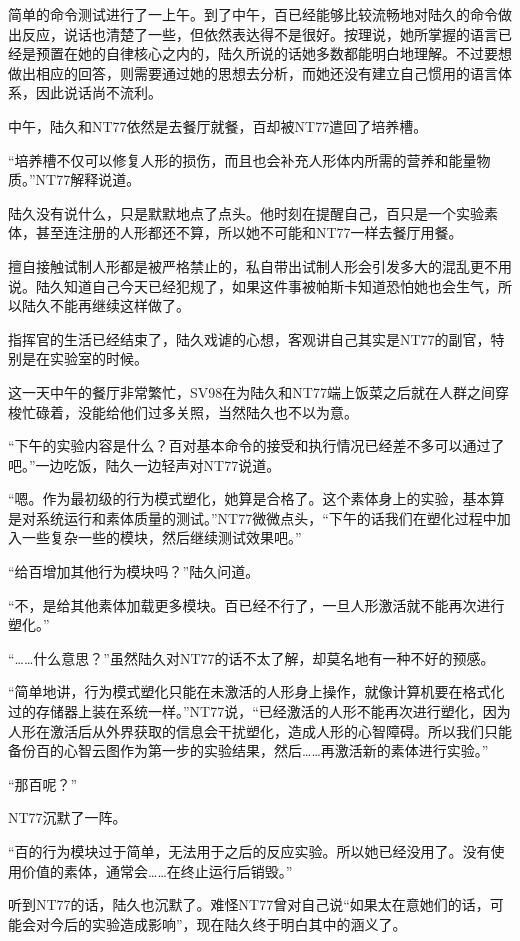简单的命令测试进行了一上午。到了中午，百已经能够比较流畅地对陆久的命令做出反应，说话也清楚了一些，但依然表达得不是很好。按理说，她所掌握的语言已经是预置在她的自律核心之内的，陆久所说的话她多数都能明白地理解。不过要想做出相应的回答，则需要通过她的思想去分析，而她还没有建立自己惯用的语言体系，因此说话尚不流利。

中午，陆久和NT77依然是去餐厅就餐，百却被NT77遣回了培养槽。

“培养槽不仅可以修复人形的损伤，而且也会补充人形体内所需的营养和能量物质。”NT77解释说道。

陆久没有说什么，只是默默地点了点头。他时刻在提醒自己，百只是一个实验素体，甚至连注册的人形都还不算，所以她不可能和NT77一样去餐厅用餐。

擅自接触试制人形都是被严格禁止的，私自带出试制人形会引发多大的混乱更不用说。陆久知道自己今天已经犯规了，如果这件事被帕斯卡知道恐怕她也会生气，所以陆久不能再继续这样做了。

指挥官的生活已经结束了，陆久戏谑的心想，客观讲自己其实是NT77的副官，特别是在实验室的时候。

这一天中午的餐厅非常繁忙，SV98在为陆久和NT77端上饭菜之后就在人群之间穿梭忙碌着，没能给他们过多关照，当然陆久也不以为意。

“下午的实验内容是什么？百对基本命令的接受和执行情况已经差不多可以通过了吧。”一边吃饭，陆久一边轻声对NT77说道。

“嗯。作为最初级的行为模式塑化，她算是合格了。这个素体身上的实验，基本算是对系统运行和素体质量的测试。”NT77微微点头，“下午的话我们在塑化过程中加入一些复杂一些的模块，然后继续测试效果吧。”

“给百增加其他行为模块吗？”陆久问道。

“不，是给其他素体加载更多模块。百已经不行了，一旦人形激活就不能再次进行塑化。”

“……什么意思？”虽然陆久对NT77的话不太了解，却莫名地有一种不好的预感。

“简单地讲，行为模式塑化只能在未激活的人形身上操作，就像计算机要在格式化过的存储器上装在系统一样。”NT77说，“已经激活的人形不能再次进行塑化，因为人形在激活后从外界获取的信息会干扰塑化，造成人形的心智障碍。所以我们只能备份百的心智云图作为第一步的实验结果，然后……再激活新的素体进行实验。”

“那百呢？”

NT77沉默了一阵。

“百的行为模块过于简单，无法用于之后的反应实验。所以她已经没用了。没有使用价值的素体，通常会……在终止运行后销毁。”

听到NT77的话，陆久也沉默了。难怪NT77曾对自己说“如果太在意她们的话，可能会对今后的实验造成影响”，现在陆久终于明白其中的涵义了。

